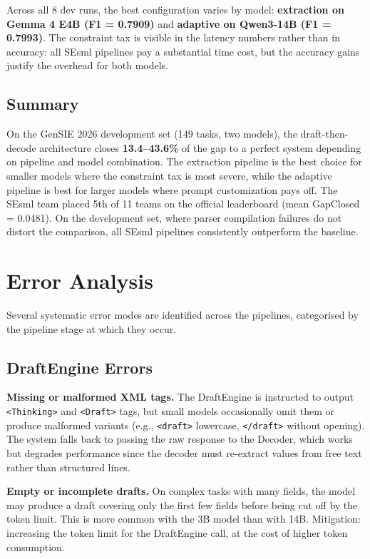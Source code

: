 \documentclass{ceurart}
\begin{document}
Across all 8 dev runs, the best configuration varies by model:
\textbf{extraction on Gemma 4 E4B (F1 = 0.7909)} and \textbf{adaptive on
Qwen3-14B (F1 = 0.7993)}.
The constraint tax is visible in the latency numbers rather than in accuracy:
all SEsml pipelines pay a substantial time cost, but the accuracy gains justify the
overhead for both models.

\subsection{Summary}

On the GenSIE 2026 development set (149 tasks, two models), the draft-then-decode
architecture closes \textbf{13.4--43.6\%} of the gap to a perfect system depending on
pipeline and model combination.
The extraction pipeline is the best choice for smaller models where the constraint tax
is most severe, while the adaptive pipeline is best for larger models where prompt
customization pays off.
The SEsml team placed 5th of 11 teams on the official leaderboard (mean GapClosed = 0.0481).
On the development set, where parser compilation failures do not distort the comparison,
all SEsml pipelines consistently outperform the baseline.

\section{Error Analysis}
\label{sec:error-analysis}

Several systematic error modes are identified across the pipelines, categorised by the
pipeline stage at which they occur.

\subsection{DraftEngine Errors}

\textbf{Missing or malformed XML tags.}
The DraftEngine is instructed to output \texttt{<Thinking>} and \texttt{<Draft>} tags,
but small models occasionally omit them or produce malformed variants (e.g.,
\texttt{<draft>} lowercase, \texttt{</draft>} without opening).
The system falls back to passing the raw response to the Decoder, which works but
degrades performance since the decoder must re-extract values from free text rather
than structured lines.

\textbf{Empty or incomplete drafts.}
On complex tasks with many fields, the model may produce a draft covering only the
first few fields before being cut off by the token limit.
This is more common with the 3B model than with 14B.
Mitigation: increasing the token limit for the DraftEngine call, at the cost of higher
token consumption.
\end{document}
